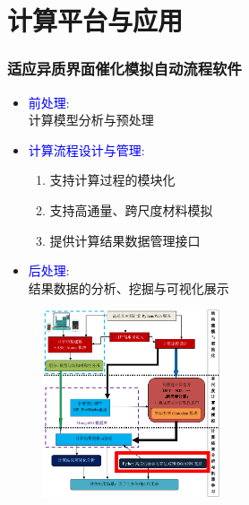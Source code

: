 \section{计算平台与应用}
\begin{frame}
	\frametitle{适应异质界面催化模拟自动流程软件}
\begin{minipage}[c]{0.42\linewidth}
\begin{itemize}
\vspace*{-2.75in}
	\item \textcolor{blue}{前处理}:\\
		计算模型分析与预处理
	\item \textcolor{blue}{计算流程设计与管理}:\\
		\begin{enumerate}
			\item 支持计算过程的模块化
			\item 支持高通量、跨尺度材料模拟
			\item 提供计算结果数据管理接口
		\end{enumerate}
	\item \textcolor{blue}{后处理}:\\
		结果数据的分析、挖掘与可视化展示
\end{itemize}
\end{minipage}
\hskip 2pt
\begin{minipage}[b]{0.47\linewidth}
\begin{figure}[h!]
\centering
\includegraphics[height=2.18in]{Figures/MP_comp_BCC.png}
\caption{\fontsize{6.5pt}{4.5pt}\selectfont{适用于异质界面的高通量材料计算自动流程软件架构}}%
\label{MP_comp_BCC}
\end{figure}
\end{minipage}
\end{frame}

